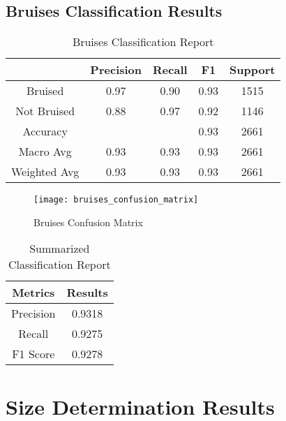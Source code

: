 \subsection{Bruises Classification Results} \label{sec:bruisesClassificationResults}

\begin{table}[htbp]
	\centering
	\begin{tabular}{c|c|c|c|c}
	  \hline
	  \textbf{ } & \textbf{Precision} & \textbf{Recall} & \textbf{F1} & \textbf{Support} \\
	  \hline
	  Bruised & 0.97 & 0.90 & 0.93 & 1515 \\
	  \hline
	  Not Bruised & 0.88 & 0.97 & 0.92 & 1146 \\
	  \hline
	  Accuracy &  &  & 0.93 & 2661 \\
	  \hline
	  Macro Avg & 0.93 & 0.93 & 0.93 & 2661 \\
	  \hline
	  Weighted Avg & 0.93 & 0.93 & 0.93 & 2661 \\
	  \hline
	\end{tabular}
	\caption{Bruises Classification Report}
	\label{tab:bruises_classification_report}
\end{table}

\begin{figure}[!htbp]
	\centering
	\texttt{[image: bruises\_confusion\_matrix]}
	\caption{Bruises Confusion Matrix}
	\label{fig:bruises_confusion_matrix_fig}
\end{figure}

\begin{table}[htbp]
	\centering
	\begin{tabular}{c|c}
	  \hline
	  \textbf{Metrics} & \textbf{Results} \\
	  \hline
	  Precision & 0.9318 \\
	  \hline
	  Recall & 0.9275 \\
	  \hline
	  F1 Score &  0.9278 \\
	  \hline
	\end{tabular}
	\caption{Summarized Classification Report}
	\label{tab:sum_bruises_classification_report}
\end{table}


\section{Size Determination Results} \label{sec:sizeDeterminationResults}

